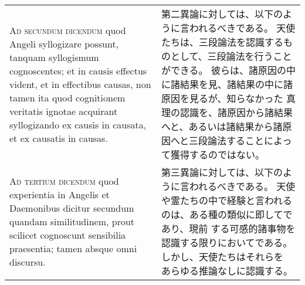 \documentclass[10pt]{jsarticle} %
\begin{document}
\begin{longtable}{p{21em}p{21em}}
 

\\



{\scshape Ad secundum dicendum} quod Angeli syllogizare
 possunt, tanquam syllogismum cognoscentes; et in causis effectus
 vident, et in effectibus causas, non tamen ita quod cognitionem
 veritatis ignotae acquirant syllogizando ex causis in causata, et ex
 causatis in causas.


&

 第二異論に対しては、以下のように言われるべきである。
 天使たちは、三段論法を認識するものとして、三段論法を行うことができる。
彼らは、諸原因の中に諸結果を見、諸結果の中に諸原因を見るが、知らなかった
 真理の認識を、諸原因から諸結果へと、あるいは諸結果から諸原因へと三段論法することによって獲得するのではない。
 
\\



{\scshape Ad tertium dicendum} quod experientia in
 Angelis et Daemonibus dicitur secundum quandam similitudinem, prout
 scilicet cognoscunt sensibilia praesentia; tamen absque omni discursu.


&

 第三異論に対しては、以下のように言われるべきである。
 天使や霊たちの中で経験と言われるのは、ある種の類似に即してであり、現前
 する可感的諸事物を認識する限りにおいてである。しかし、天使たちはそれらを
 あらゆる推論なしに認識する。


\end{longtable}
\end{document}
